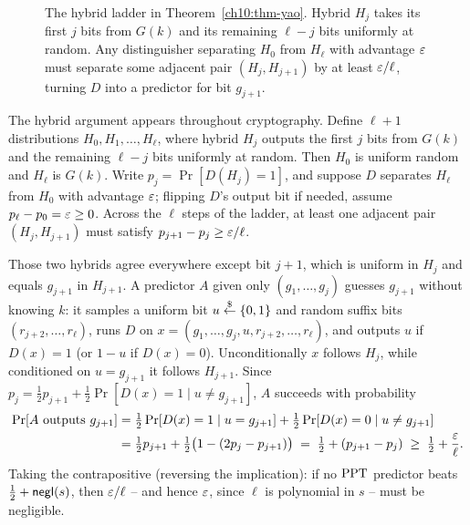 \begin{figure}[htbp]
\caption{The hybrid ladder in Theorem~\ref{ch10:thm-yao}. Hybrid $H_j$ takes its first $j$ bits from $G(k)$ and its remaining $\ell - j$ bits uniformly at random. Any distinguisher separating $H_0$ from $H_\ell$ with advantage $\varepsilon$ must separate some adjacent pair $(H_j, H_{j+1})$ by at least $\varepsilon/\ell$, turning $D$ into a predictor for bit $g_{j+1}$.}
\label{ch10:fig-hybrids}
\end{figure}

\begin{whybox}
The hybrid argument appears throughout cryptography. Define $\ell + 1$ distributions $H_0, H_1, \dots, H_\ell$, where hybrid $H_j$ outputs the first $j$ bits from $G(k)$ and the remaining $\ell - j$ bits uniformly at random. Then $H_0$ is uniform random and $H_\ell$ is $G(k)$. Write $p_j = \Pr[D(H_j) = 1]$, and suppose $D$ separates $H_\ell$ from $H_0$ with advantage $\varepsilon$; flipping $D$'s output bit if needed, assume $p_\ell - p_0 = \varepsilon \ge 0$. Across the $\ell$ steps of the ladder, at least one adjacent pair $(H_j, H_{j+1})$ must satisfy $p_{j+1} - p_j \ge \varepsilon/\ell$.

Those two hybrids agree everywhere except bit $j{+}1$, which is uniform in $H_j$ and equals $g_{j+1}$ in $H_{j+1}$. A predictor $A$ given only $(g_1,\dots,g_j)$ guesses $g_{j+1}$ without knowing $k$: it samples a uniform bit $u \stackrel{\$}{\gets} \{0,1\}$ and random suffix bits $(r_{j+2},\dots,r_\ell)$, runs $D$ on $x = (g_1,\dots,g_j, u, r_{j+2},\dots,r_\ell)$, and outputs $u$ if $D(x) = 1$ (or $1-u$ if $D(x) = 0$). Unconditionally $x$ follows $H_j$, while conditioned on $u = g_{j+1}$ it follows $H_{j+1}$. Since $p_j = \tfrac12 p_{j+1} + \tfrac12 \Pr[D(x)=1 \mid u \ne g_{j+1}]$, $A$ succeeds with probability
\begin{align*}
  \Pr[A \text{ outputs } g_{j+1}]
  &= \tfrac12 \Pr[D(x)=1 \mid u = g_{j+1}] + \tfrac12 \Pr[D(x)=0 \mid u \ne g_{j+1}] \\
  &= \tfrac12 p_{j+1} + \tfrac12 \bigl(1 - (2p_j - p_{j+1})\bigr)
  \;=\; \tfrac12 + (p_{j+1} - p_j) \;\ge\; \tfrac12 + \frac{\varepsilon}{\ell}.
\end{align*}
Taking the contrapositive (reversing the implication): if no $\mathrm{PPT}$ predictor beats $\tfrac12 + \mathsf{negl}(s)$, then $\varepsilon/\ell$ -- and hence $\varepsilon$, since $\ell$ is polynomial in $s$ -- must be negligible.
\end{whybox}

